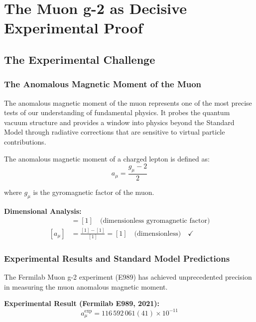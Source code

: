 \documentclass[12pt,a4paper]{report}
\begin{document}
	\chapter{The Muon g-2 as Decisive Experimental Proof}
	\label{chap:muon_g2}
	
	\section{The Experimental Challenge}
	\label{sec:muon_g2_experiment}
	
	\subsection{The Anomalous Magnetic Moment of the Muon}
	\label{subsec:anomalous_magnetic_moment}
	
	The anomalous magnetic moment of the muon represents one of the most precise tests of our understanding of fundamental physics. It probes the quantum vacuum structure and provides a window into physics beyond the Standard Model through radiative corrections that are sensitive to virtual particle contributions.
	
	The anomalous magnetic moment of a charged lepton is defined as:
	\begin{equation}
		a_\mu = \frac{g_\mu - 2}{2}
		\label{eq:anomalous_moment_definition}
	\end{equation}
	
	where $g_\mu$ is the gyromagnetic factor of the muon.
	
	\textbf{Dimensional Analysis:}
	\begin{align}
		[g_\mu] &= [1] \quad \text{(dimensionless gyromagnetic factor)} \\
		[a_\mu] &= \frac{[1] - [1]}{[1]} = [1] \quad \text{(dimensionless)} \quad \checkmark
	\end{align}
	
	\subsection{Experimental Results and Standard Model Predictions}
	\label{subsec:experimental_results}
	
	The Fermilab Muon g-2 experiment (E989) has achieved unprecedented precision in measuring the muon anomalous magnetic moment.
	
	\textbf{Experimental Result (Fermilab E989, 2021):}
	\begin{equation}
		a_\mu^{\text{exp}} = 116\,592\,061(41) \times 10^{-11}
		\label{eq:experimental_value}
	\end{equation}
	
\end{document}
